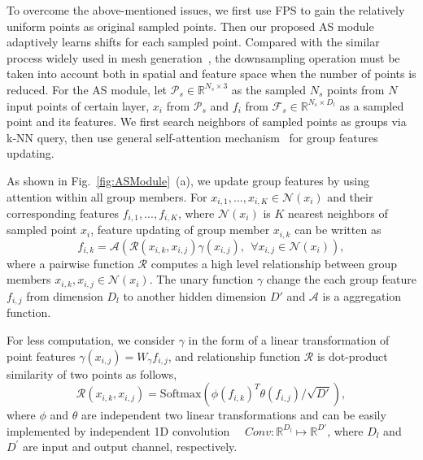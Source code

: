 \documentclass[10pt,twocolumn,letterpaper]{article}
\begin{document}
	
	To overcome the above-mentioned issues, we first use FPS to gain the relatively uniform points as original sampled points. Then our proposed AS module adaptively learns shifts for each sampled point. Compared with the similar process widely used in mesh generation~\cite{wang2018pixel2mesh}, the downsampling operation must be taken into account both in spatial and feature space when the number of points is reduced.  For the AS module, let $\mathcal{P}_{s} \in \mathbb{R}^{N_s\times 3}$ as the sampled $N_s$ points from  $N$ input points of certain layer, $x_i$ from $\mathcal{P}_{s}$ and $f_i$ from $\mathcal{F}_s \in \mathbb{R}^{N_s\times D_l}$ as  a sampled point and its features. We first search neighbors of sampled points as groups via k-NN query, then use general self-attention mechanism~\cite{vaswani2017attention} for group features updating.
	
	
	As shown in Fig.~\ref{fig:ASModule}~(a), we update group features by using attention within all group members. For $x_{i,1},..., x_{i,K} \in \mathcal{N}(x_i)$ and their corresponding features $f_{i,1},..., f_{i,K}$, where $\mathcal{N}(x_i)$ is $K$ nearest neighbors of sampled point $x_i$, feature updating of group member $x_{i,k}$ can be written as 
	\begin{equation}
	f_{i,k} =  \mathcal{A}(\mathcal{R}(x_{i,k} ,x_{i,j})\gamma(x_{i,j}),~~ \forall x_{i,j} \in \mathcal{N}(x_i)),
	\label{eqattention}
	\end{equation}
	where a pairwise function $\mathcal{R}$ computes a high level relationship between group members $x_{i,k}, x_{i,j} \in \mathcal{N}(x_i)$. The unary function $\gamma$ change the each group feature $f_{i,j}$ from dimension $D_l$ to another hidden dimension $D'$ and $\mathcal{A}$ is a aggregation function. 
	
	For less computation, we consider $\gamma$ in the form of a linear transformation of point features  $\gamma(x_{i,j}) =W_{\gamma} f_{i,j} $, and relationship function $\mathcal{R}$ is dot-product similarity of two points as follows, 
	\begin{equation}
	\mathcal{R}(x_{i,k} ,x_{i,j}) = {\text{Softmax}}(\phi(f_{i,k})^T \theta(f_{i,j}) /\sqrt{D'}),
	\end{equation}
	where $\phi$ and $\theta$ are independent two linear transformations and can be easily implemented by independent 1D convolution ~~$Conv:\mathbb{R}^{D_{l}} \mapsto \mathbb{R}^{D'} $, where $D_l$ and $D^{'}$ are input and output channel, respectively. 
	
	
\end{document}
